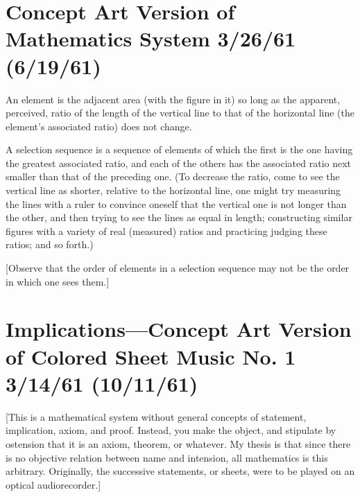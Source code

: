 \section*{Concept Art Version of Mathematics System 3/26/61 (6/19/61)}

An element is the adjacent area (with the figure in it) so long as the 
apparent, perceived, ratio of the length of the vertical line to that of the 
horizontal line (the element's associated ratio) does not change. 

A selection sequence is a sequence of elements of which the first is the one 
having the greatest associated ratio, and each of the others has the associated 
ratio next smaller than that of the preceding one. (To decrease the ratio, 
come to see the vertical line as shorter, relative to the horizontal line, one 
might try measuring the lines with a ruler to convince oneself that the 
vertical one is not longer than the other, and then trying to see the lines as 
equal in length; constructing similar figures with a variety of real (measured) 
ratios and practicing judging these ratios; and so forth.) 

[Observe that the order of elements in a selection sequence may not be the 
order in which one sees them.] 



\section*{Implications---Concept Art Version of Colored Sheet Music No. 1 3/14/61 (10/11/61)}

[This is a mathematical system without general concepts of statement, 
implication, axiom, and proof. Instead, you make the object, and stipulate 
by ostension that it is an axiom, theorem, or whatever. My thesis is that 
since there is no objective relation between name and intension, all 
mathematics is this arbitrary. Originally, the successive statements, or sheets, 
were to be played on an optical audiorecorder.]

